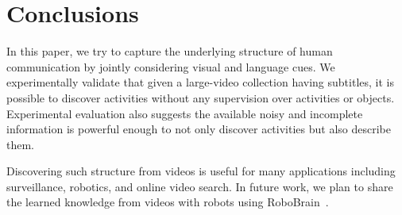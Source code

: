 

\section{Conclusions}
\vspace{-2mm}
In this paper, we try to capture the underlying structure of human communication by jointly considering visual and language cues. We experimentally validate that given a large-video collection having subtitles, it is possible to discover activities without any supervision over activities or objects. Experimental evaluation also suggests the available noisy and incomplete information is powerful enough to not only discover activities but also describe them.

Discovering such structure from videos is useful for many applications including surveillance, robotics, and online video search.  In future work, we plan to share the learned knowledge from videos with robots
using RoboBrain~\cite{robobrain}.
\vspace{-2mm}
